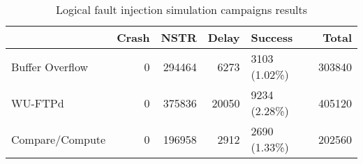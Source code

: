 \begin{table}[t]
\centering
\caption{Logical fault injection simulation campaigns results}
\label{table:end_sim_by_status_hamming_multi_bitflip_reg_multi}
\begin{tabular}{lrrrlr}
\toprule
 & Crash & NSTR & Delay & Success & Total \\
\midrule
Buffer Overflow & 0 & 294464 & 6273 & 3103 (1.02\%) & 303840 \\
WU-FTPd & 0 & 375836 & 20050 & 9234 (2.28\%) & 405120 \\
Compare/Compute & 0 & 196958 & 2912 & 2690 (1.33\%) & 202560 \\
\bottomrule
\end{tabular}
\end{table}
